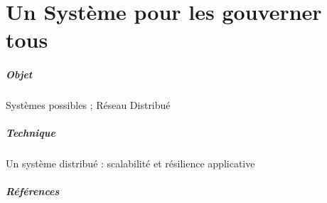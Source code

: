 \chapter{Un Système pour les gouverner tous}
\paragraph{Objet} Systèmes possibles ; Réseau Distribué
\paragraph{Technique} Un système distribué : scalabilité et résilience applicative
\paragraph{Références}
\cite{Deleuze0}
\cite{Foucault0}
\cite{Negri0}
\cite{Pieces0}
\cite{ProgrammableCity0}
\cite{ProgrammableCity1}
\cite{PsychoPass}



 
